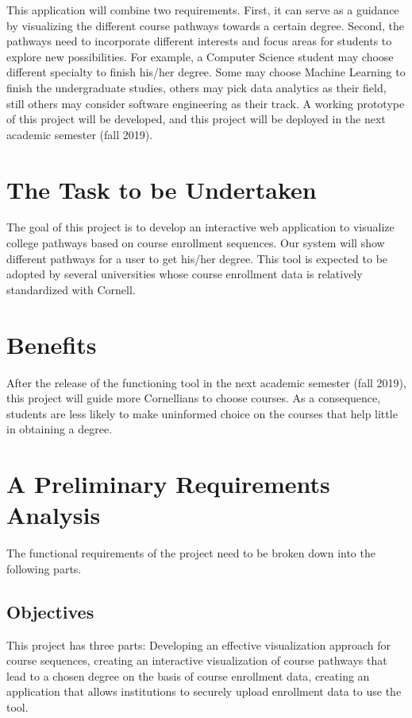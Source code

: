 \documentclass{article}
\begin{document}
\vspace{0.4cm}This application will combine two requirements. First, it can serve as a guidance by visualizing the different course pathways towards a certain degree. Second, the pathways need to incorporate different interests and focus areas for students to explore new possibilities. For example, a Computer Science student may choose different specialty to finish his/her degree. Some may choose Machine Learning to finish the undergraduate studies, others may pick data analytics as their field, still others may consider software engineering as their track. A working prototype of this project will be developed, and this project will be deployed in the next academic semester (fall 2019).

\section{The Task to be Undertaken}
The goal of this project is to develop an interactive web application to visualize college pathways based on course enrollment sequences. Our system will show different pathways for a user to get his/her degree. This tool is expected to be adopted by several universities whose course enrollment data is relatively standardized with Cornell.

\section{Benefits}
After the release of the functioning tool in the next academic semester (fall 2019), this project will guide more Cornellians to choose courses. As a consequence, students are less likely to make uninformed choice on the courses that help little in obtaining a degree.

\section{A Preliminary Requirements Analysis}
The functional requirements of the project need to be broken down into the following parts.
\subsection{Objectives}
This project has three parts: Developing an effective visualization approach for course sequences, creating an interactive visualization of course pathways that lead to a chosen degree on the basis of course enrollment data, creating an application that allows institutions to securely upload enrollment data to use the tool.
\end{document}

